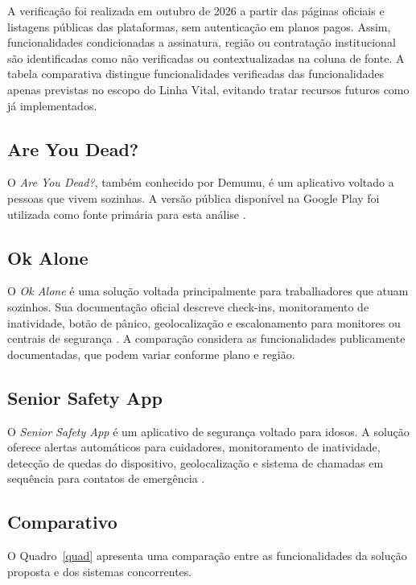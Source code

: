 A verificação foi realizada em outubro de 2026 a partir das páginas oficiais e listagens públicas das plataformas, sem autenticação em planos pagos. Assim, funcionalidades condicionadas a assinatura, região ou contratação institucional são identificadas como não verificadas ou contextualizadas na coluna de fonte. A tabela comparativa distingue funcionalidades verificadas das funcionalidades apenas previstas no escopo do Linha Vital, evitando tratar recursos futuros como já implementados.

\subsection{Are You Dead?}

O \textit{Are You Dead?}, também conhecido por Demumu, é um aplicativo voltado a pessoas que vivem sozinhas. A versão pública disponível na Google Play foi utilizada como fonte primária para esta análise \cite{demumu2026}.

\subsection{Ok Alone}

O \textit{Ok Alone} é uma solução voltada principalmente para trabalhadores que atuam sozinhos. Sua documentação oficial descreve check-ins, monitoramento de inatividade, botão de pânico, geolocalização e escalonamento para monitores ou centrais de segurança \cite{okalone2026}. A comparação considera as funcionalidades publicamente documentadas, que podem variar conforme plano e região.

\subsection{Senior Safety App}

O \textit{Senior Safety App} é um aplicativo de segurança voltado para idosos. A solução oferece alertas automáticos para cuidadores, monitoramento de inatividade, detecção de quedas do dispositivo, geolocalização e sistema de chamadas em sequência para contatos de emergência \cite{seniorsafetyapp}.

\subsection{Comparativo}

O Quadro~\ref{quad} apresenta uma comparação entre as funcionalidades da solução proposta e dos sistemas concorrentes.


